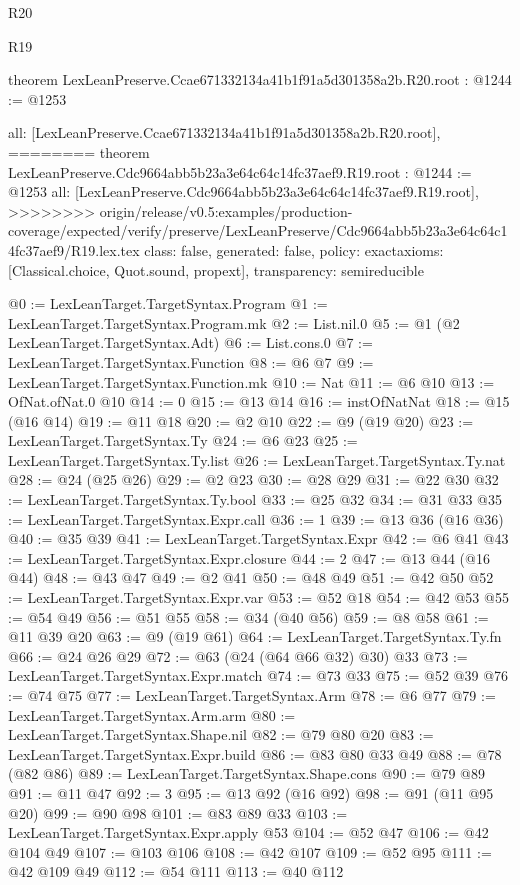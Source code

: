 \begin{lexlean}{R20}
\begin{lexlean}{R19}
\begin{coremodule}
{{{{{{{{{{{{{theorem LexLeanPreserve.Ccae671332134a41b1f91a5d301358a2b.R20.root : @1244 := @1253 {
  all: [LexLeanPreserve.Ccae671332134a41b1f91a5d301358a2b.R20.root],
========
theorem LexLeanPreserve.Cdc9664abb5b23a3e64c64c14fc37aef9.R19.root : @1244 := @1253 {
  all: [LexLeanPreserve.Cdc9664abb5b23a3e64c64c14fc37aef9.R19.root],
>>>>>>>> origin/release/v0.5:examples/production-coverage/expected/verify/preserve/LexLeanPreserve/Cdc9664abb5b23a3e64c64c14fc37aef9/R19.lex.tex
  class: false,
  generated: false,
  policy: exact{axioms: [Classical.choice, Quot.sound, propext]},
  transparency: semireducible
}

@0 := LexLeanTarget.TargetSyntax.Program
@1 := LexLeanTarget.TargetSyntax.Program.mk
@2 := List.nil.{0}
@5 := @1 (@2 LexLeanTarget.TargetSyntax.Adt)
@6 := List.cons.{0}
@7 := LexLeanTarget.TargetSyntax.Function
@8 := @6 @7
@9 := LexLeanTarget.TargetSyntax.Function.mk
@10 := Nat
@11 := @6 @10
@13 := OfNat.ofNat.{0} @10
@14 := 0
@15 := @13 @14
@16 := instOfNatNat
@18 := @15 (@16 @14)
@19 := @11 @18
@20 := @2 @10
@22 := @9 (@19 @20)
@23 := LexLeanTarget.TargetSyntax.Ty
@24 := @6 @23
@25 := LexLeanTarget.TargetSyntax.Ty.list
@26 := LexLeanTarget.TargetSyntax.Ty.nat
@28 := @24 (@25 @26)
@29 := @2 @23
@30 := @28 @29
@31 := @22 @30
@32 := LexLeanTarget.TargetSyntax.Ty.bool
@33 := @25 @32
@34 := @31 @33
@35 := LexLeanTarget.TargetSyntax.Expr.call
@36 := 1
@39 := @13 @36 (@16 @36)
@40 := @35 @39
@41 := LexLeanTarget.TargetSyntax.Expr
@42 := @6 @41
@43 := LexLeanTarget.TargetSyntax.Expr.closure
@44 := 2
@47 := @13 @44 (@16 @44)
@48 := @43 @47
@49 := @2 @41
@50 := @48 @49
@51 := @42 @50
@52 := LexLeanTarget.TargetSyntax.Expr.var
@53 := @52 @18
@54 := @42 @53
@55 := @54 @49
@56 := @51 @55
@58 := @34 (@40 @56)
@59 := @8 @58
@61 := @11 @39 @20
@63 := @9 (@19 @61)
@64 := LexLeanTarget.TargetSyntax.Ty.fn
@66 := @24 @26 @29
@72 := @63 (@24 (@64 @66 @32) @30) @33
@73 := LexLeanTarget.TargetSyntax.Expr.match
@74 := @73 @33
@75 := @52 @39
@76 := @74 @75
@77 := LexLeanTarget.TargetSyntax.Arm
@78 := @6 @77
@79 := LexLeanTarget.TargetSyntax.Arm.arm
@80 := LexLeanTarget.TargetSyntax.Shape.nil
@82 := @79 @80 @20
@83 := LexLeanTarget.TargetSyntax.Expr.build
@86 := @83 @80 @33 @49
@88 := @78 (@82 @86)
@89 := LexLeanTarget.TargetSyntax.Shape.cons
@90 := @79 @89
@91 := @11 @47
@92 := 3
@95 := @13 @92 (@16 @92)
@98 := @91 (@11 @95 @20)
@99 := @90 @98
@101 := @83 @89 @33
@103 := LexLeanTarget.TargetSyntax.Expr.apply @53
@104 := @52 @47
@106 := @42 @104 @49
@107 := @103 @106
@108 := @42 @107
@109 := @52 @95
@111 := @42 @109 @49
@112 := @54 @111
@113 := @40 @112
}}}}}}}}}}}}}}
\end{coremodule}
\end{lexlean}
\end{lexlean}
